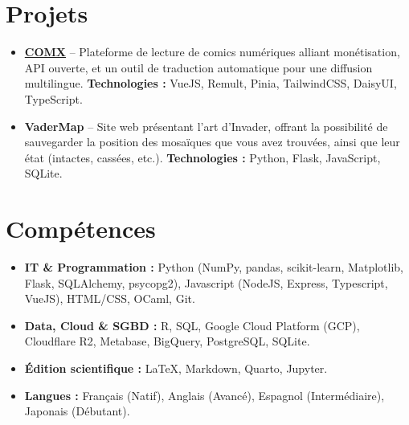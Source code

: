 \documentclass[11pt,a4paper]{article}
\begin{document}
\section*{Projets}
\vspace{-0.1cm}
\begin{itemize}[leftmargin=0.4cm, itemsep=4pt]
    \item \textbf{\hyperlink{https://comx.click/}{COMX}} -- Plateforme de lecture de comics numériques alliant monétisation, API ouverte, et un outil de traduction automatique pour une diffusion multilingue.
    \textbf{Technologies :} VueJS, Remult, Pinia, TailwindCSS, DaisyUI, TypeScript.
    \item \textbf{VaderMap} -- Site web présentant l'art d'Invader, offrant la possibilité de sauvegarder la position des mosaïques que vous avez trouvées, ainsi que leur état (intactes, cassées, etc.).
    \textbf{Technologies :} Python, Flask, JavaScript, SQLite. 
\end{itemize}

\vspace{0.2cm}

\section*{Compétences}
\vspace{-0.2cm}
\begin{itemize}[leftmargin=0.4cm, itemsep=1pt]
    \item \textbf{IT \& Programmation :} Python (NumPy, pandas, scikit-learn, Matplotlib, Flask, SQLAlchemy, psycopg2), Javascript (NodeJS, Express, Typescript, VueJS), HTML/CSS, OCaml, Git.
    \item \textbf{Data, Cloud \& SGBD :} R, SQL, Google Cloud Platform (GCP), Cloudflare R2, Metabase, BigQuery, PostgreSQL, SQLite.
    \item \textbf{Édition scientifique :} \LaTeX, Markdown, Quarto, Jupyter.
    \item \textbf{Langues :} Français (Natif), Anglais (Avancé), Espagnol (Intermédiaire), Japonais (Débutant).
\end{itemize}
\end{document}
